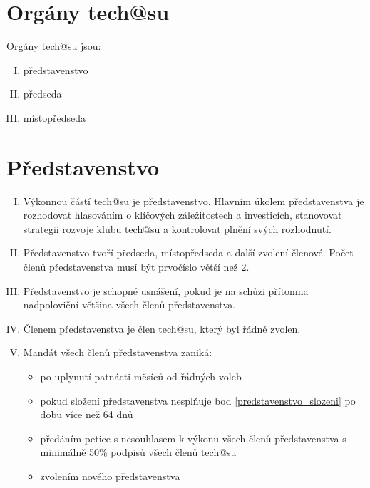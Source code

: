\documentclass[10pt]{article}
\begin{document}
\section{Orgány tech@su} %
Orgány tech@su jsou:
	\begin{enumerate}[I.]
	\item představenstvo 
	\item předseda  
	\item místopředseda  
	\end{enumerate}

\section{Představenstvo} %
	\begin{enumerate}[I.]
	\item Výkonnou částí tech@su je představenstvo. Hlavním úkolem představenstva je rozhodovat hlasováním o klíčových záležitostech a investicích, stanovovat strategii rozvoje klubu tech@su a kontrolovat plnění svých rozhodnutí. 
	\item \label{predstavenstvo_slozeni} Představenstvo tvoří předseda, místopředseda a další zvolení členové. Počet členů představenstva musí být prvočíslo větší než 2.
	\item Představenstvo je schopné usnášení, pokud je na schůzi přítomna nadpoloviční většina všech členů představenstva.
	\item Členem představenstva je člen tech@su, který byl řádně zvolen.
	\item Mandát všech členů představenstva zaniká:
	\begin{itemize}
		\item po uplynutí patnácti měsíců od řádných voleb
		\item pokud složení představenstva nesplňuje bod \ref{predstavenstvo_slozeni} po dobu více než 64 dnů
		\item předáním petice s nesouhlasem k výkonu všech členů představenstva s minimálně 50\% podpisů všech členů tech@su
		\item zvolením nového představenstva
	\end{itemize}



\end{enumerate}
\end{document}

